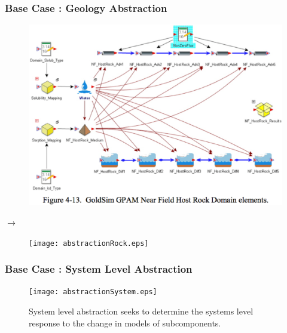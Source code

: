\begin{frame}[ctb!]
  \frametitle{Base Case : Geology Abstraction}
  \begin{minipage}{0.45\textwidth}
    \begin{figure}[h!]
      \begin{center}
        \includegraphics[width=\textwidth]{rock.eps}
      \end{center}
    \end{figure}
  \end{minipage}
  \hspace{0.01cm}\large{$\rightarrow$}\hspace{0.01cm}
  \begin{minipage}{0.45\textwidth}
    \begin{figure}[h!]
      \begin{center}
        \texttt{[image: abstractionRock.eps]}
      \end{center}
    \end{figure}
  \end{minipage}
\end{frame}

\begin{frame}[ctb!]
  \frametitle{Base Case : System Level Abstraction}
  \begin{figure}[h!]
      \texttt{[image: abstractionSystem.eps]}
    \caption{System level abstraction seeks to determine the systems level 
    response to the change in models of subcomponents.}
  \end{figure}
\end{frame}
